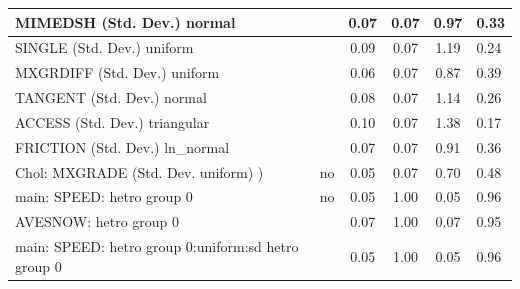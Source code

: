 \begin{table}
\begin{center}
\begin{tabular}{|l|l|c|c|c|l|}
			\hline
			MIMEDSH (Std. Dev.) normal &  & 0.07 & 0.07 & 0.97 & 0.33 \\
			\hline
			SINGLE (Std. Dev.) uniform &  & 0.09 & 0.07 & 1.19 & 0.24 \\
			\hline
			MXGRDIFF (Std. Dev.) uniform &  & 0.06 & 0.07 & 0.87 & 0.39 \\
			\hline
			TANGENT (Std. Dev.) normal &  & 0.08 & 0.07 & 1.14 & 0.26 \\
			\hline
			ACCESS (Std. Dev.) triangular &  & 0.10 & 0.07 & 1.38 & 0.17 \\
			\hline
			FRICTION (Std. Dev.) ln_normal &  & 0.07 & 0.07 & 0.91 & 0.36 \\
			\hline
			 Chol: MXGRADE (Std. Dev. uniform) ) & no & 0.05 & 0.07 & 0.70 & 0.48 \\
			\hline
			main: SPEED: hetro group 0 & no & 0.05 & 1.00 & 0.05 & 0.96 \\
			\hline
			AVESNOW: hetro group 0 &  & 0.07 & 1.00 & 0.07 & 0.95 \\
			\hline
			main: SPEED: hetro group 0:uniform:sd  hetro group 0 &  & 0.05 & 1.00 & 0.05 & 0.96 \\
			\hline
		\end{tabular}
	\end{center}
\end{table}